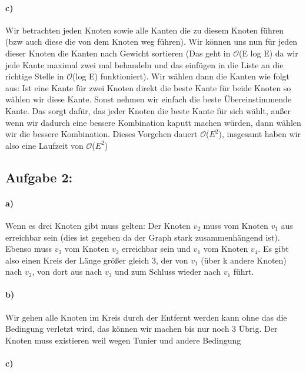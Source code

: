 \documentclass[a4paper]{article}
\def\Oh{\ensuremath{\mathcal{O}}} %
\begin{document}
\paragraph{c)}
Wir betrachten jeden Knoten sowie alle Kanten die zu diesem Knoten führen (bzw auch diese die
von dem Knoten weg führen). Wir können uns nun für jeden dieser Knoten die Kanten nach 
Gewicht sortieren (Das geht in \Oh(E log E) da wir jede Kante maximal zwei mal behandeln und das 
einfügen in die Liste an die richtige Stelle in \Oh(log E) funktioniert). Wir wählen dann die 
Kanten wie folgt aus: Ist eine Kante für zwei Knoten direkt die beste Kante für beide Knoten so 
wählen wir diese Kante. Sonst nehmen wir einfach die beste Übereinstimmende Kante. Das sorgt 
dafür, das jeder Knoten die beste Kante für sich wählt, außer wenn wir dadurch eine bessere 
Kombination kaputt machen würden, dann wählen wir die bessere Kombination. Dieses Vorgehen 
dauert \Oh($E^2$), insgesamt haben wir also eine Laufzeit von \Oh($E^2$)
\subsection*{Aufgabe 2:}
\paragraph{a)}
Wenn es drei Knoten gibt muss gelten: Der Knoten $v_2$ muss vom Knoten $v_1$ aus erreichbar sein 
(dies ist gegeben da der Graph stark zusammenhängend ist). Ebenso muss $v_3$ vom Knoten $v_2$
erreichbar sein und $v_1$ vom Knoten $v_4$. Es gibt also einen Kreis der Länge größer gleich 
3, der von $v_1$ (über k andere Knoten) nach $v_2$, von dort aus nach $v_3$ und zum Schluss wieder
nach $v_1$ führt. 
\paragraph{b)}
Wir gehen alle Knoten im Kreis durch der Entfernt werden kann ohne das die 
Bedingung verletzt wird, das können wir machen bis nur noch 3 Übrig.
Der Knoten muss existieren weil wegen Tunier und andere Bedingung
\paragraph{c)}
\end{document}
